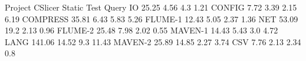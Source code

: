 Project CSlicer Static Test Query
IO 25.25 4.56 4.3 1.21
CONFIG 7.72 3.39 2.15 6.19
COMPRESS 35.81 6.43 5.83 5.26
FLUME-1 12.43 5.05 2.37 1.36
NET 53.09 19.2 2.13 0.96
FLUME-2 25.48 7.98 2.02 0.55
MAVEN-1 14.43 5.43 3.0 4.72
LANG 141.06 14.52 9.3 11.43
MAVEN-2 25.89 14.85 2.27 3.74
CSV 7.76 2.13 2.34 0.8
